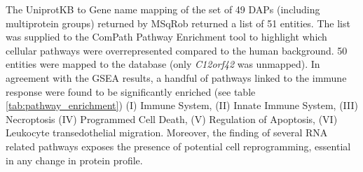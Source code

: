 The UniprotKB to Gene name mapping of the set of 49 \ac{DAP}s (including multiprotein groups) returned by MSqRob returned a list of 51 entities. The list was supplied to the ComPath Pathway Enrichment tool to highlight which cellular pathways were overrepresented compared to the human background. 50 entities were mapped to the database (only \textit{C12orf42} was unmapped). In agreement with the \ac{GSEA} results, a handful of pathways linked to the immune response were found to be significantly enriched (see table \ref{tab:pathway_enrichment}) (I) Immune System, (II) Innate Immune System, (III) Necroptosis (IV) Programmed Cell Death, (V) Regulation of Apoptosis, (VI) Leukocyte transedothelial migration. Moreover, the finding of several RNA related pathways exposes the presence of potential cell reprogramming, essential in any change in protein profile.

